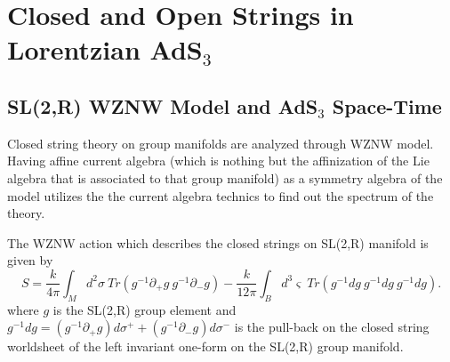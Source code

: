 \documentclass[a4paper,12pt]{article}
\begin{document}
\section{Closed and Open Strings in Lorentzian AdS$_{3}$}

\subsection{SL(2,R) WZNW Model and AdS$_{3}$ Space-Time}

Closed string theory on group manifolds are analyzed through WZNW model.
Having affine current algebra (which is nothing but the affinization of the
Lie algebra that is associated to that group manifold) as a symmetry algebra
of the model utilizes the the current algebra technics to find out the
spectrum of the theory.

The WZNW action which describes the closed strings on SL(2,R) manifold is
given by
\begin{equation}
S=\frac{k}{4\pi }\int_{M}d^{2}\sigma \ Tr\left( g^{-1}\partial _{+}g\
g^{-1}\partial _{-}g\right) -\frac{k}{12\pi }\int_{B}d^{3}\varsigma \
Tr\left( g^{-1}dg\ g^{-1}dg\ g^{-1}dg\right) .  \label{WZWaction}
\end{equation}
where $g$ is the SL(2,R) group element and $g^{-1}dg=\left( g^{-1}\partial
_{+}g\right) d\sigma ^{+}+\left( g^{-1}\partial _{-}g\right) d\sigma ^{-}$
is the pull-back on the closed string worldsheet of the left invariant
one-form on the SL(2,R) group manifold.
\end{document}

